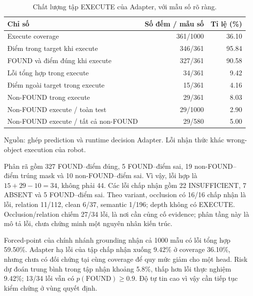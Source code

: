 \begin{table}[htbp]
    \centering
    \setlength{\tabcolsep}{4pt}
    \renewcommand{\arraystretch}{1.15}
    \caption{Chất lượng tập EXECUTE của Adapter, với mẫu số rõ ràng.}
    \label{tab:results-execute-quality}
    \small
    \begin{tabularx}{\textwidth}{@{}>{\raggedright\arraybackslash}Xrr@{}}
        \toprule
        Chỉ số & Số đếm / mẫu số & Tỉ lệ (\%) \\
        \midrule
        Execute coverage & 361/1000 & 36.10 \\
        Điểm trong target khi execute & 346/361 & 95.84 \\
        FOUND và điểm đúng khi execute & 327/361 & 90.58 \\
        Lỗi tổng hợp trong execute & 34/361 & 9.42 \\
        Điểm ngoài target trong execute & 15/361 & 4.16 \\
        Non-FOUND trong execute & 29/361 & 8.03 \\
        Non-FOUND execute / toàn test & 29/1000 & 2.90 \\
        Non-FOUND execute / tất cả non-FOUND & 29/580 & 5.00 \\
        \bottomrule
    \end{tabularx}
    {\footnotesize\raggedright Nguồn: ghép prediction và runtime decision Adapter.
    Lỗi nhận thức khác wrong-object execution của robot.\par}
\end{table}

Phân rã gồm 327 FOUND--điểm đúng, 5 FOUND--điểm sai,
19 non-FOUND--điểm trúng mask và 10 non-FOUND--điểm sai.
Vì vậy, lỗi hợp là $15+29-10=34$, không phải 44.
Các lỗi chấp nhận gồm 22 INSUFFICIENT, 7 ABSENT và 5 FOUND--điểm sai.
Theo variant, occlusion có 16/16 chấp nhận là lỗi, relation 11/112,
clean 6/37, semantic 1/196; depth không có EXECUTE.
Occlusion/relation chiếm 27/34 lỗi, là nơi cần củng cố evidence;
phân tầng này là mô tả lỗi, chưa chứng minh một nguyên nhân kiến trúc.

Forced-point của chính nhánh grounding nhận cả 1000 mẫu có lỗi tổng hợp
59.50\%. Adapter hạ lỗi của tập chấp nhận xuống 9.42\% ở coverage 36.10\%,
nhưng chưa có đối chứng tại cùng coverage để quy mức giảm cho một head.
Risk dự đoán trung bình trong tập nhận khoảng 5.8\%, thấp hơn lỗi
thực nghiệm 9.42\%; 13/34 lỗi vẫn có $p(\mathrm{FOUND})\geq0.9$.
Độ tự tin cao vì vậy cần tiếp tục kiểm chứng ở vùng quyết định.

